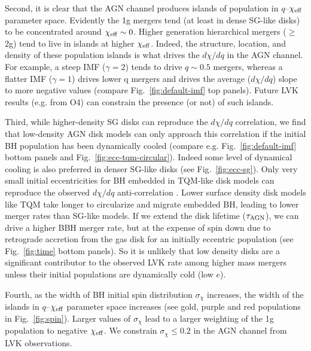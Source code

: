 Second, it is clear that the AGN channel produces islands of population in $q$--$\chi_{\rm eff}$ parameter space.
Evidently the 1g mergers tend (at least in dense SG-like disks) to be concentrated around $\chi_{\rm eff} \sim 0$.
Higher generation hierarchical mergers ($\geq$2g) tend to live in islands at higher $\chi_{\rm eff}$.
Indeed, the structure, location, and density of these population islands is what drives the $d\chi/dq$ in the AGN channel.
For example, a steep IMF ($\gamma=2$) tends to drive $q \sim 0.5$ mergers, whereas a flatter IMF ($\gamma=1$) drives lower q mergers and drives the average ($d\chi/dq$) slope to more negative values (compare Fig.~\ref{fig:default-imf} top panels).
Future LVK results (e.g.
from O4) can constrain the presence (or not) of such islands.

Third, while higher-density SG disks can reproduce the $d\chi/dq$ correlation, we find that low-density AGN disk models can only approach this correlation if the initial BH population has been dynamically cooled (compare e.g.
Fig.~\ref{fig:default-imf} bottom panels and Fig.~\ref{fig:ecc-tqm-circular}).
Indeed some level of dynamical cooling is also preferred in denser SG-like disks (see Fig.~\ref{fig:ecc-sg}).
Only very small initial eccentricities for BH embedded in TQM-like disk models can reproduce the observed $d\chi/dq$ anti-correlation  \citep{Callister+21}.
Lower surface density disk models like TQM take longer to circularize and migrate embedded BH, leading to lower merger rates than SG-like models.
If we extend the disk lifetime ($\tau_{\rm AGN}$), we can drive a higher BBH merger rate, but at the expense of spin down due to retrograde accretion from the gas disk for an initially eccentric population (see Fig.~\ref{fig:time} bottom panels).
So it is unlikely that low density disks are a significant contributor to the observed LVK rate among higher mass mergers unless their initial populations are dynamically cold (low $e$).

Fourth, as the width of BH initial spin distribution $\sigma_\chi$ increases, the width of the islands in $q$--$\chi_{\rm eff}$ parameter space increases (see gold, purple and red populations in  Fig.~\ref{fig:spin}).
Larger values of $\sigma_\chi$ lead to a larger weighting of the 1g population to negative $\chi_{\rm eff}$.
We constrain $\sigma_\chi \leq 0.2$ in the AGN channel from LVK observations.

